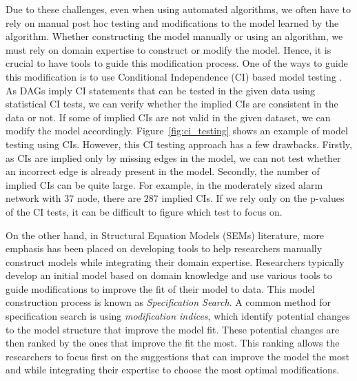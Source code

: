 \documentclass[letterpaper]{article} %
\begin{document}

Due to these challenges, even when using automated algorithms, we often have to
rely on manual post hoc testing and modifications to the model learned by the
algorithm. Whether constructing the model manually or using an
algorithm, we must rely on domain expertise to construct or modify the
model. Hence, it is crucial to have tools to guide this modification process.
One of the ways to guide this modification is to use Conditional Independence
(CI) based model testing \cite{Ankan2021}. As DAGs imply CI statements that can
be tested in the given data using statistical CI tests, we can verify whether
the implied CIs are consistent in the data or not. If some of implied CIs are
not valid in the given dataset, we can modify the model accordingly.
Figure~\ref{fig:ci_testing} shows an example of model testing using CIs.
However, this CI testing approach has a few drawbacks. Firstly, as CIs are
implied only by missing edges in the model, we can not test whether an
incorrect edge is already present in the model. Secondly, the number of implied
CIs can be quite large. For example, in the moderately sized alarm network with 
$ 37 $ node, there are $287$ implied CIs. If we rely only on the p-values of the
CI tests, it can be difficult to figure which test to focus on.

On the other hand, in Structural Equation Models (SEMs) literature, more
emphasis has been placed on developing tools to help researchers manually
construct models while integrating their domain expertise. Researchers
typically develop an initial model based on domain knowledge and use various
tools to guide modifications to improve the fit of their model to data. This
model construction process is known as \emph{Specification Search}. A common
method for specification search is using \emph{modification indices}, which
identify potential changes to the model structure that improve the model fit.
These potential changes are then ranked by the ones that improve the fit the
most. This ranking allows the researchers to focus first on the suggestions
that can improve the model the most and while integrating their expertise to
choose the most optimal modifications.
\end{document}

